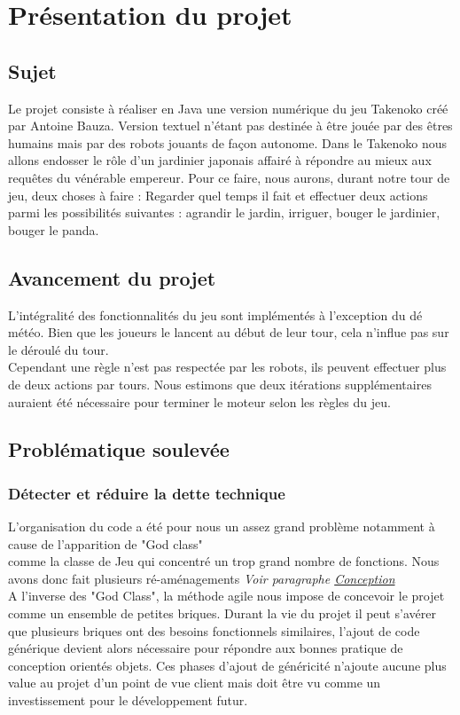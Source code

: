 

\chapter{Présentation du projet}


\section{Sujet}
Le projet consiste à réaliser en Java une version numérique du jeu Takenoko créé par Antoine Bauza. Version textuel n'étant pas destinée à être jouée par des êtres humains mais par des robots jouants de façon autonome. Dans le Takenoko nous allons endosser le rôle d'un jardinier japonais affairé à répondre au mieux aux requêtes du vénérable empereur. Pour ce faire, nous aurons, durant notre tour de jeu, deux choses à faire : Regarder quel temps il fait et effectuer deux actions parmi les possibilités suivantes : agrandir le jardin, irriguer, bouger le jardinier, bouger le panda. 

\section{Avancement du projet}
L'intégralité des fonctionnalités du jeu sont implémentés à l'exception du dé météo. Bien que les joueurs le lancent au début de leur tour, cela n'influe pas sur le déroulé du tour.\\
Cependant une règle n'est pas respectée par les robots, ils peuvent effectuer plus de deux actions par tours.
Nous estimons que deux itérations supplémentaires auraient été nécessaire pour terminer le moteur selon les règles du jeu.
\section{Problématique soulevée}

\subsection{Détecter et réduire la dette technique}
L'organisation du code a été pour nous un assez grand problème notamment à cause de l'apparition de "God class"\footnotemark\\ comme la classe de Jeu qui concentré un trop grand nombre de fonctions. Nous avons donc fait plusieurs ré-aménagements \textit{Voir paragraphe \hyperref[conception]{Conception}} \\ 
A l'inverse des "God Class", la méthode agile nous impose de concevoir le projet comme un ensemble de petites briques. Durant la vie du projet il peut s'avérer que plusieurs briques ont des besoins fonctionnels similaires, l'ajout de code générique devient alors nécessaire pour répondre aux bonnes pratique de conception orientés objets. Ces phases d'ajout de généricité n'ajoute aucune plus value au projet d'un point de vue client mais doit être vu comme un investissement pour le développement futur.

